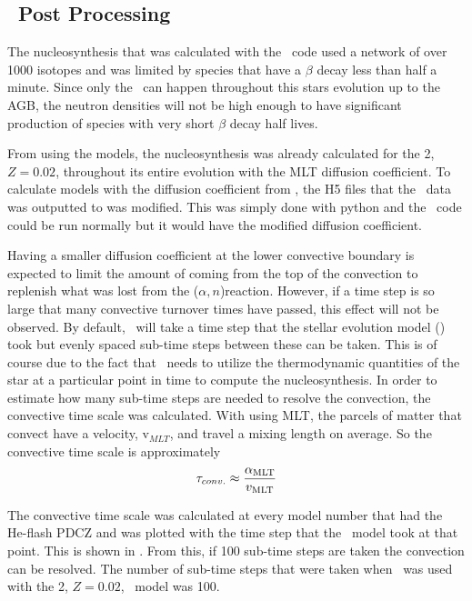 \documentclass[fleqn,usenatbib]{mnras}
\begin{document}
\subsection{\mppnp~Post Processing}
\label{sec:mppnp}

The nucleosynthesis that was calculated with the \mppnp~code used a network of over 1000 isotopes and was limited by species that have a $\beta$ decay less than half a minute. Since only the \spr~can happen throughout this stars evolution up to the AGB, the neutron densities will not be high enough to have significant production of species with very short $\beta$ decay half lives. 

From using the \citet{models} models, the nucleosynthesis was already calculated for the 2\Msun, $Z=0.02$, throughout its entire evolution with the MLT diffusion coefficient. To calculate models with the diffusion coefficient from , the H5 files that the \MESA~data was outputted to was modified. This was simply done with python and the \mppnp~code could be run normally but it would have the modified diffusion coefficient. 

Having a smaller diffusion coefficient at the lower convective boundary is expected to limit the amount of \neon[22] coming from the top of the convection to replenish what was lost from the \neon[22]($\alpha,n$)\magnesium[25] reaction. However, if a time step is so large that many convective turnover times have passed, this effect will not be observed. By default, \mppnp~will take a time step that the stellar evolution model (\MESA) took but evenly spaced sub-time steps between these can be taken. This is of course due to the fact that \mppnp~needs to utilize the thermodynamic quantities of the star at a particular point in time to compute the nucleosynthesis. In order to estimate how many sub-time steps are needed to resolve the convection, the convective time scale was calculated. With using MLT, the parcels of matter that convect have a velocity, v$_{MLT}$, and travel a mixing length on average. So the convective time scale is approximately
\begin{equation}
\tau_{conv.} \approx \frac{\alpha_{\mathrm{MLT}}}{v_{\mathrm{MLT}}}
\label{eq:tau}
\end{equation}

\noindent The convective time scale was calculated at every model number that had the He-flash PDCZ and was plotted with the time step that the \MESA~model took at that point. This is shown in . From this, if 100 sub-time steps are taken the convection can be resolved. The number of sub-time steps that were taken when \mppnp~was used with the 2\Msun, $Z=0.02$, \MESA~model was 100. 
\end{document}
